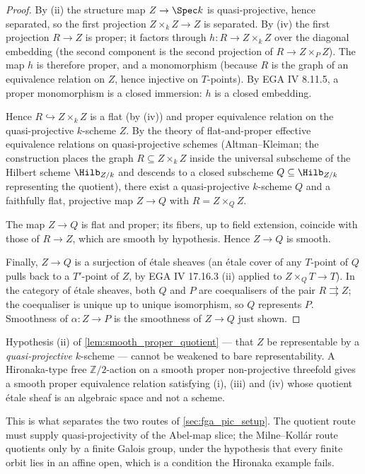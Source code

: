 \begin{proof}
  By (ii) the structure map \(Z \to \Spec k\) is quasi-projective, hence
  separated, so the first projection \(Z \times_k Z \to Z\) is separated.
  By (iv) the first projection \(R \to Z\) is proper; it factors through
  \(h : R \to Z \times_k Z\) over the diagonal embedding (the second
  component is the second projection of \(R \to Z \times_P Z\)). The map
  \(h\) is therefore proper, and a monomorphism (because \(R\) is the graph
  of an equivalence relation on \(Z\), hence injective on \(T\)-points).
  By EGA IV 8.11.5, a proper monomorphism is a closed immersion: \(h\) is a
  closed embedding.

  Hence \(R \hookrightarrow Z \times_k Z\) is a flat (by (iv)) and proper
  equivalence relation on the quasi-projective \(k\)-scheme \(Z\). By the
  theory of flat-and-proper effective equivalence relations on
  quasi-projective schemes (Altman--Kleiman; the construction places
  the graph \(R \subseteq Z \times_k Z\) inside the universal subscheme of
  the Hilbert scheme \(\Hilb_{Z/k}\) and descends to a closed subscheme
  \(Q \subseteq \Hilb_{Z/k}\) representing the quotient), there exist a
  quasi-projective \(k\)-scheme \(Q\) and a faithfully flat, projective map
  \(Z \to Q\) with \(R = Z \times_Q Z\).

  The map \(Z \to Q\) is flat and proper; its fibers, up to field
  extension, coincide with those of \(R \to Z\), which are smooth by
  hypothesis. Hence \(Z \to Q\) is smooth.

  Finally, \(Z \to Q\) is a surjection of \'etale sheaves (an \'etale
  cover of any \(T\)-point of \(Q\) pulls back to a \(T'\)-point of \(Z\), by
  EGA IV 17.16.3 (ii) applied to \(Z \times_Q T \to T\)). In the category
  of \'etale sheaves, both \(Q\) and \(P\) are coequalisers of the pair
  \(R \rightrightarrows Z\); the coequaliser is unique up to unique
  isomorphism, so \(Q\) represents \(P\). Smoothness of \(\alpha : Z \to P\)
  is the smoothness of \(Z \to Q\) just shown.
\end{proof}

\begin{remark}
  \label{rem:smooth_proper_quotient_hypothesis}
  Hypothesis (ii) of \cref{lem:smooth_proper_quotient} --- that \(Z\) be
  representable by a \emph{quasi-projective} \(k\)-scheme --- cannot be weakened
  to bare representability. A Hironaka-type free \(\mathbb{Z}/2\)-action on a
  smooth proper non-projective threefold gives a smooth proper equivalence
  relation satisfying (i), (iii) and (iv) whose quotient \'etale sheaf is an
  algebraic space and not a scheme.

  This is what separates the two routes of \cref{sec:fga_pic_setup}. The
  quotient route must supply quasi-projectivity of the Abel-map slice; the
  Milne--Koll\'ar route quotients only by a finite Galois group, under the
  hypothesis that every finite orbit lies in an affine open, which is a
  condition the Hironaka example fails.
\end{remark}

